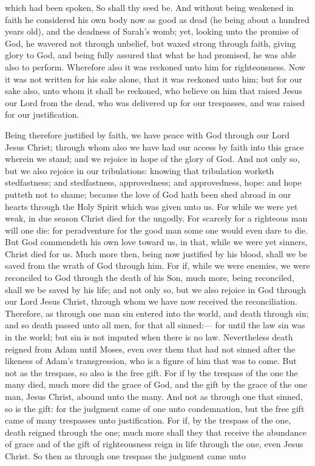 which had been spoken, So shall thy seed be. And without being weakened in faith he considered his own body now as good as dead (he being about a hundred years old), and the deadness of Sarah’s womb; yet, looking unto the promise of God, he wavered not through unbelief, but waxed strong through faith, giving glory to God, and being fully assured that what he had promised, he was able also to perform. Wherefore also it was reckoned unto him for righteousness. Now it was not written for his sake alone, that it was reckoned unto him; but for our sake also, unto whom it shall be reckoned, who believe on him that raised Jesus our Lord from the dead, who was delivered up for our trespasses, and was raised for our justification. 

Being therefore justified by faith, we have peace with God through our Lord Jesus Christ; through whom also we have had our access by faith into this grace wherein we stand; and we rejoice in hope of the glory of God. And not only so, but we also rejoice in our tribulations: knowing that tribulation worketh stedfastness; and stedfastness, approvedness; and approvedness, hope: and hope putteth not to shame; because the love of God hath been shed abroad in our hearts through the Holy Spirit which was given unto us. For while we were yet weak, in due season Christ died for the ungodly. For scarcely for a righteous man will one die: for peradventure for the good man some one would even dare to die. But God commendeth his own love toward us, in that, while we were yet sinners, Christ died for us. Much more then, being now justified by his blood, shall we be saved from the wrath of God through him. For if, while we were enemies, we were reconciled to God through the death of his Son, much more, being reconciled, shall we be saved by his life; and not only so, but we also rejoice in God through our Lord Jesus Christ, through whom we have now received the reconciliation.  Therefore, as through one man sin entered into the world, and death through sin; and so death passed unto all men, for that all sinned:— for until the law sin was in the world; but sin is not imputed when there is no law. Nevertheless death reigned from Adam until Moses, even over them that had not sinned after the likeness of Adam’s transgression, who is a figure of him that was to come. But not as the trespass, so also is the free gift. For if by the trespass of the one the many died, much more did the grace of God, and the gift by the grace of the one man, Jesus Christ, abound unto the many. And not as through one that sinned, so is the gift: for the judgment came of one unto condemnation, but the free gift came of many trespasses unto justification. For if, by the trespass of the one, death reigned through the one; much more shall they that receive the abundance of grace and of the gift of righteousness reign in life through the one, even Jesus Christ. So then as through one trespass the judgment came unto 